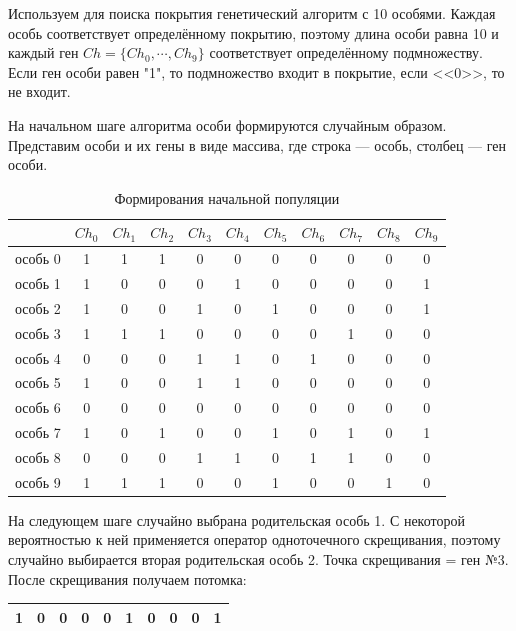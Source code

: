 Используем для поиска покрытия генетический алгоритм с 10 особями.
Каждая особь соответствует определённому покрытию, поэтому длина особи равна 10 и каждый ген
$Ch=\{Ch_0,\cdots,Ch_9\}$ соответствует определённому подмножеству. Если ген особи равен "1", то подмножество входит в покрытие, если <<0>>, то не входит.

На начальном шаге алгоритма особи формируются случайным образом. Представим особи и их гены в виде 
массива, где строка --- особь, столбец --- ген особи.

\captionsetup{justification=raggedright, singlelinecheck=false}
\begin{table}[H]
	\centering
	\begin{threeparttable}
		\caption{\label{tbl:genex}Формирования начальной популяции}
		\begin{tabular}{|c|c|c|c|c|c|c|c|c|c|c|}
			\hline
&$Ch_0$& $Ch_1$& $Ch_2$& $Ch_3$& $Ch_4$& $Ch_5$& $Ch_6$& $Ch_7$& $Ch_8$& $Ch_9$\\\hline
особь 0& 1& 1& 1& 0& 0& 0& 0& 0& 0& 0\\\hline
особь 1& 1& 0& 0& 0& 1& 0& 0& 0& 0& 1\\\hline
особь 2& 1& 0& 0& 1& 0& 1& 0& 0& 0& 1\\\hline
особь 3& 1& 1& 1& 0& 0& 0& 0& 1& 0& 0\\\hline
особь 4& 0& 0& 0& 1& 1& 0& 1& 0& 0& 0\\\hline
особь 5& 1& 0& 0& 1& 1& 0& 0& 0& 0& 0\\\hline
особь 6& 0& 0& 0& 0& 0& 0& 0& 0& 0& 0\\\hline
особь 7& 1& 0& 1& 0& 0& 1& 0& 1& 0& 1\\\hline
особь 8& 0& 0& 0& 1& 1& 0& 1& 1& 0& 0\\\hline
особь 9& 1& 1& 1& 0& 0& 1& 0& 0& 1& 0\\\hline
		\end{tabular}
\end{threeparttable}
\end{table}

На следующем шаге случайно выбрана родительская особь 1. С некоторой вероятностью к ней применяется оператор одноточечного скрещивания, поэтому случайно выбирается вторая родительская особь 2. Точка скрещивания = ген №3. После скрещивания получаем потомка:

\begin{table}[H]
	\centering
	\begin{threeparttable}
		\begin{tabular}{|c|c|c|c|c|c|c|c|c|c|}
			\hline
			1& 0& 0& 0& 0& 1& 0& 0& 0& 1 \\\hline
		\end{tabular}
	\end{threeparttable}
\end{table}

